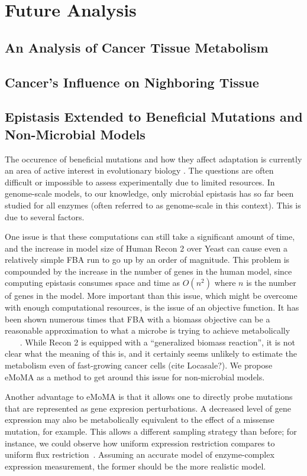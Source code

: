 \documentclass[phd,tocprelim]{cornell}
\theoremstyle{break}
\begin{document}
\section{Future Analysis}
\subsection{An Analysis of Cancer Tissue Metabolism}
\subsection{Cancer's Influence on Nighboring Tissue}
\subsection{Epistasis Extended to Beneficial Mutations and Non-Microbial Models}

The occurence of beneficial mutations and how they affect adaptation is currently an area of active
interest in evolutionary biology \cite{Chou2011} \cite{Weinreich2006}. The questions are often difficult
or impossible to assess experimentally due to limited resources.  In genome-scale models, to our knowledge,
only microbial epistasis has so far been studied for all enzymes (often referred to as genome-scale 
in this context). This is due to several factors.

One issue is that these computations can still take a significant amount of time, and the increase in model
size of Human Recon 2 over Yeast can cause even a relatively simple FBA run to go up by an order of magnitude.
This problem is compounded by the increase in the number of genes in the human model, since computing epistasis
consumes space and time as $O(n^2)$ where $n$ is the number of genes in the model. More important than this issue,
which might be overcome with enough computational resources, is the issue of an objective function. It has been shown
numerous times that FBA with a biomass objective can be a reasonable approximation to what a microbe is trying to 
achieve metabolically ~\cite{Schuetz2012}~\cite{Fong2004}~\cite{Varma1994} . While Recon 2 is equipped with a ``generalized biomass reaction'', it is not clear
what the meaning of this is, and it certainly seems unlikely to estimate the metabolism even of fast-growing cancer
cells (cite Locasale?). We propose eMoMA as a method to get around this issue for non-microbial models.

Another advantage to eMoMA is that it allows one to directly probe mutations that are represented as gene expresion
perturbations. A decreased level of gene expression may also be metabolically equivalent to the effect of a missense
mutation, for example. This allows a different sampling strategy than before; for instance, we could observe how uniform 
expression restriction compares to uniform flux restriction~\cite{Xu2012}. Assuming an accurate model of enzyme-complex
expression measurement, the former should be the more realistic model.
\end{document}
